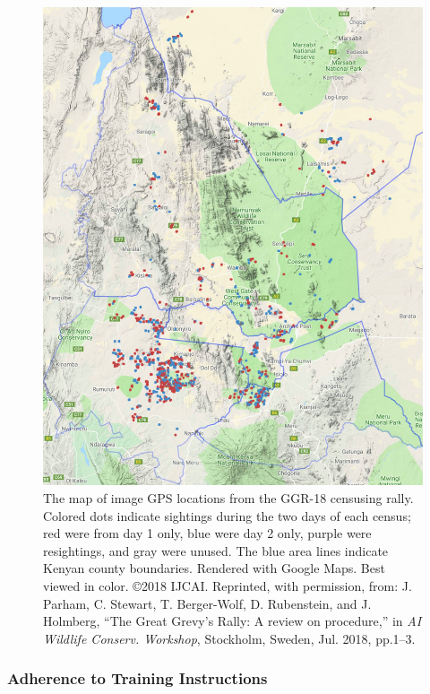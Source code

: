 \begin{figure}[!t]
    \begin{center}
        \includegraphics[width=0.83\linewidth]{resources/ggr2018.pdf}
    \end{center}
    \caption{The map of image GPS locations from the GGR-18 censusing rally.  Colored dots indicate sightings during the two days of each census; red were from day 1 only, blue were day 2 only, purple were resightings, and gray were unused.  The blue area lines indicate Kenyan county boundaries.  Rendered with Google Maps. Best viewed in color.  \copyright 2018 IJCAI. Reprinted, with permission, from: J. Parham, C. Stewart, T. Berger-Wolf, D. Rubenstein, and J. Holmberg, ``The Great Grevy’s Rally: A review on procedure,'' in \textit{AI Wildlife Conserv. Workshop}, Stockholm, Sweden, Jul. 2018, pp.1–3.}
    \label{fig:maps-ggr18}
\end{figure}

\subsubsection{Adherence to Training Instructions}

